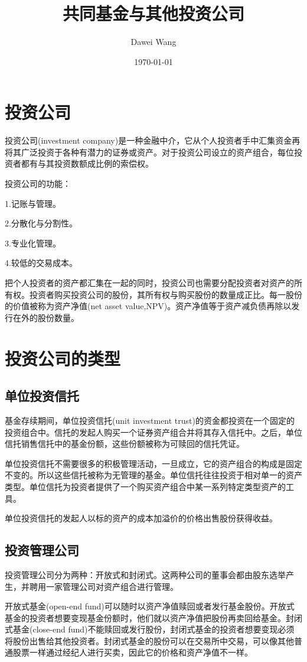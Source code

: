 \documentclass{article}
\title{共同基金与其他投资公司}
\author{Dawei Wang}
\date{\today}
\begin{document}
	\maketitle
\section{投资公司}
投资公司(investment company)是一种金融中介，它从个人投资者手中汇集资金再将其广泛投资于各种有潜力的证券或资产。对于投资公司设立的资产组合，每位投资者都有与其投资数额成比例的索偿权。

投资公司的功能：

1.记账与管理。

2.分散化与分割性。

3.专业化管理。

4.较低的交易成本。

\hspace*{\fill}

把个人投资者的资产都汇集在一起的同时，投资公司也需要分配投资者对资产的所有权。投资者购买投资公司的股份，其所有权与购买股份的数量成正比。每一股份的价值被称为资产净值(net asset value,NPV)。资产净值等于资产减负债再除以发行在外的股份数量。

\section{投资公司的类型}
\subsection{单位投资信托}
基金存续期间，单位投资信托(unit investment trust)的资金都投资在一个固定的投资组合中。信托的发起人购买一个证券资产组合并将其存入信托中。之后，单位信托销售信托中的基金份额，这些份额被称为可赎回的信托凭证。

单位投资信托不需要很多的积极管理活动，一旦成立，它的资产组合的构成是固定不变的。所以这些信托被称为无管理的基金。单位信托往往投资于相对单一的资产类型。单位信托为投资者提供了一个购买资产组合中某一系列特定类型资产的工具。

单位投资信托的发起人以标的资产的成本加溢价的价格出售股份获得收益。

\subsection{投资管理公司}
投资管理公司分为两种：开放式和封闭式。这两种公司的董事会都由股东选举产生，并聘用一家管理公司对资产组合进行管理。

开放式基金(open-end fund)可以随时以资产净值赎回或者发行基金股份。开放式基金的投资者想要变现基金份额时，他们就以资产净值把股份再卖回给基金。封闭式基金(close-end fund)不能赎回或发行股份，封闭式基金的投资者想要变现必须将股份出售给其他投资者。封闭式基金的股份可以在交易所中交易，可以像其他普通股票一样通过经纪人进行买卖，因此它的价格和资产净值不一样。
\end{document}
